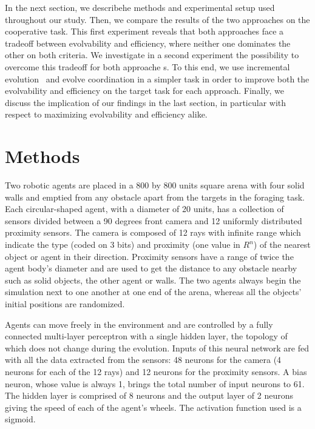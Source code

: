   In the next section, we describehe methods and experimental setup used throughout our study. Then, we compare the results of the two approaches on the cooperative task. This first experiment reveals that both approaches face a tradeoff between evolvability and efficiency, where neither one dominates the other on both criteria. We investigate in a second experiment the possibility to overcome this tradeoff for both approache s. To this end, we use incremental evolution~\parencite{Harvey1994, Urzelai1998} and evolve coordination in a simpler task in order to improve both the evolvability and efficiency on the target task for each approach. Finally, we discuss the implication of our findings in the last section, in particular with respect to maximizing evolvability and efficiency alike.


\section{Methods}
  
  Two robotic agents are placed in a 800 by 800 units square arena with four solid walls and emptied from any obstacle apart from the targets in the foraging task. Each circular-shaped agent, with a diameter of 20 units, has a collection of sensors divided between a 90 degrees front camera and 12 uniformly distributed proximity sensors. The camera is composed of 12 rays with infinite range which indicate the type (coded on 3 bits) and proximity (one value in $R^n$) of the nearest object or agent in their direction. Proximity sensors have a range of twice the agent body's diameter and are used to get the distance to any obstacle nearby such as solid objects, the other agent or walls. The two agents always begin the simulation next to one another at one end of the arena, whereas all the objects' initial positions are randomized.

  Agents can move freely in the environment and are controlled by a fully connected multi-layer perceptron with a single hidden layer, the topology of which does not change during the evolution. Inputs of this neural network are fed with all the data extracted from the sensors: 48 neurons for the camera (4 neurons for each of the 12 rays) and 12 neurons for the proximity sensors. A bias neuron, whose value is always 1, brings the total number of input neurons to 61. The hidden layer is comprised of 8 neurons and the output layer of 2 neurons giving the speed of each of the agent's wheels. The activation function used is a sigmoid.


